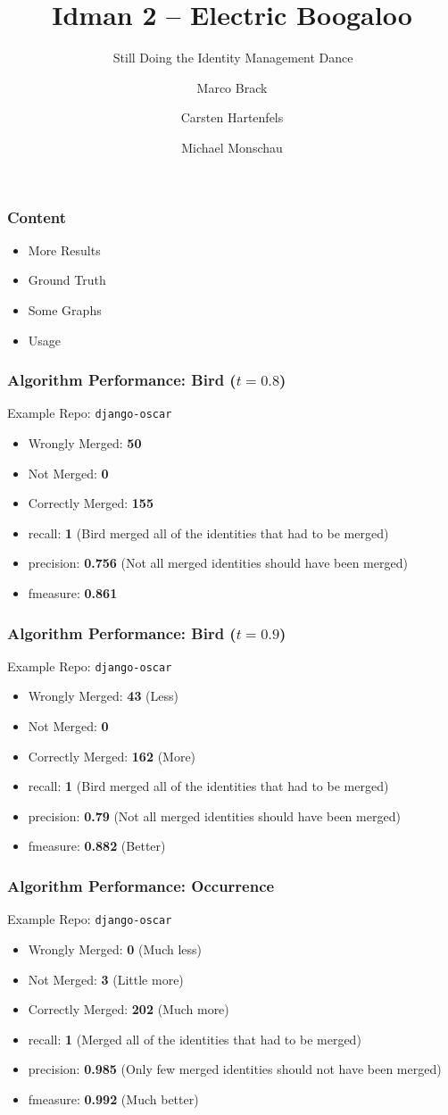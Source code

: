 \documentclass[slidestop,usenames,dvipsnames]{beamer}
\title{Idman 2 -- Electric Boogaloo}
\subtitle{💃\ Still Doing the Identity Management Dance 💃}
\author{Marco Brack \and Carsten Hartenfels \and Michael Monschau}
\newcommand{\gitem}{\vfill\item}
\begin{document}
\begin{frame}
    \titlepage
\end{frame}




\begin{frame}
    \frametitle{Content}
    \begin{itemize}
       \gitem More Results
       \gitem Ground Truth
       \gitem Some Graphs
       \gitem Usage
    \end{itemize}
    \vfill
\end{frame}


\begin{frame}
  \frametitle{Algorithm Performance: Bird ($t=0.8$)}
  Example Repo: \texttt{django-oscar}
  \begin{itemize}
    \gitem Wrongly Merged: \textbf{50}
    \gitem Not Merged: \textbf{0}
    \gitem Correctly Merged: \textbf{155}
  \end{itemize}
  \begin{itemize}
    \gitem recall: \textbf{1} (Bird merged all of the identities that had to be merged)
    \gitem precision: \textbf{0.756} (Not all merged identities should have been merged)
    \gitem fmeasure: \textbf{0.861}
  \end{itemize}
  \vfill
\end{frame}


\begin{frame}
  \frametitle{Algorithm Performance: Bird ($t=0.9$)}
  Example Repo: \texttt{django-oscar}
  \begin{itemize}
    \gitem Wrongly Merged: \textbf{43} (Less)
    \gitem Not Merged: \textbf{0}
    \gitem Correctly Merged: \textbf{162} (More)
  \end{itemize}
  \begin{itemize}
    \gitem recall: \textbf{1} (Bird merged all of the identities that had to be merged)
    \gitem precision: \textbf{0.79} (Not all merged identities should have been merged)
    \gitem fmeasure: \textbf{0.882} (Better)
  \end{itemize}
  \vfill
\end{frame}


\begin{frame}
  \frametitle{Algorithm Performance: Occurrence}
  Example Repo: \texttt{django-oscar}
  \begin{itemize}
    \gitem Wrongly Merged: \textbf{0} (Much less)
    \gitem Not Merged: \textbf{3} (Little more)
    \gitem Correctly Merged: \textbf{202} (Much more)
  \end{itemize}
  \begin{itemize}
    \gitem recall: \textbf{1} (Merged all of the identities that had to be merged)
    \gitem precision: \textbf{0.985} (Only few merged identities should not have been merged)
    \gitem fmeasure: \textbf{0.992} (Much better)
  \end{itemize}
  \vfill
\end{frame}
\end{document}
